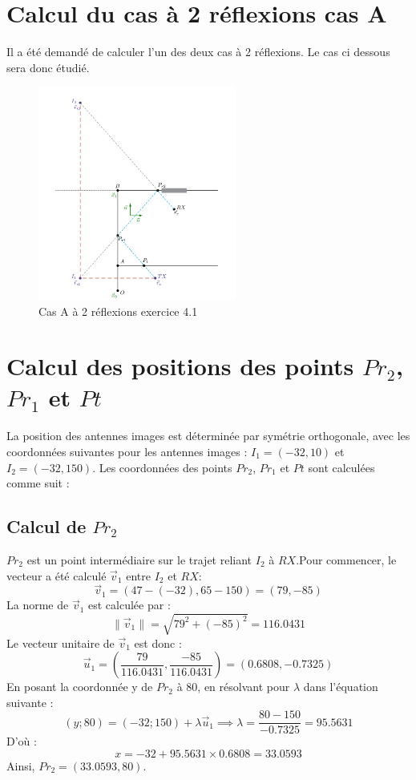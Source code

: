 \section{Calcul du cas à 2 réflexions cas A}
Il a été demandé de calculer l'un des deux cas à 2 réflexions. Le cas ci dessous sera donc étudié.  
\begin{figure}[H]
    \centering
    \includegraphics[width=0.58\textwidth]{Pictures/ex41.png}
    \caption{Cas A à 2 réflexions exercice 4.1}
    \label{fig:enter-label}
\end{figure}
\section*{Calcul des positions des points $Pr_2$, $Pr_1$ et $Pt$}

La position des antennes images est déterminée par symétrie orthogonale, avec les coordonnées suivantes pour les antennes images : $I_1 = (-32, 10)$ et $I_2 = (-32, 150)$. Les coordonnées des points $Pr_2$, $Pr_1$ et $Pt$ sont calculées comme suit :


\subsection*{Calcul de $Pr_2$}
$Pr_2$ est un point intermédiaire sur le trajet reliant $I_2$ à $RX$.Pour commencer, le vecteur a été calculé $\vec{v}_1$ entre $I_2$ et $RX$:
\[
\vec{v}_1 = (47 - (-32), 65 - 150) = (79, -85)
\]
La norme de $\vec{v}_1$ est calculée par :
\[
\|\vec{v}_1\| = \sqrt{79^2 + (-85)^2} = 116.0431
\]
Le vecteur unitaire de $\vec{v}_1$ est donc :
\[
\vec{u}_1 = \left(\frac{79}{116.0431}, \frac{-85}{116.0431}\right) = (0.6808, -0.7325)
\]
En posant la coordonnée y de $Pr_2$ à 80, en résolvant pour $\lambda$ dans l'équation suivante :
\[
(y; 80) = (-32; 150) + \lambda \vec{u}_1 \implies \lambda = \frac{80 - 150}{-0.7325} = 95.5631
\]
D'où :
\[
x = -32 + 95.5631 \times 0.6808 = 33.0593
\]
Ainsi, $Pr_2 = (33.0593, 80)$.

